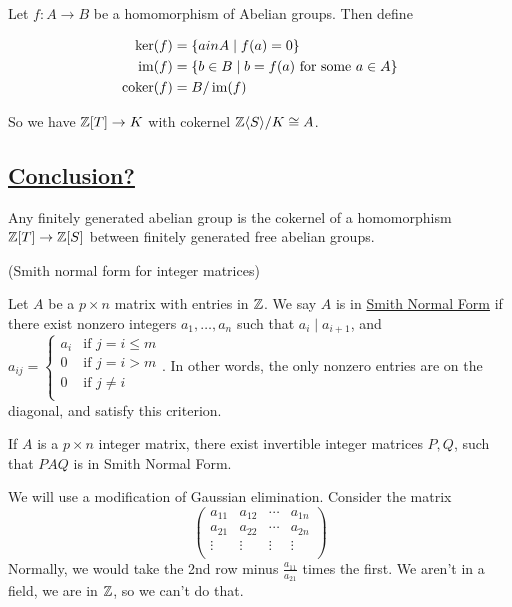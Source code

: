 \documentclass[x11names,reqno,14pt]{extarticle}
\begin{document}
Let $f:A\to B$ be a homomorphism of Abelian groups. Then define

\begin{align*}
\ker(f) & = \{a in A \mid f(a) = 0 \} \\
\operatorname{\mathrm{im}}(f) & = \{ b \in B \mid b = f(a)\text{ for some }a \in A \} \\
\operatorname{\mathrm{coker}}(f) & = B/\operatorname{\mathrm{im}}(f) \\
\end{align*}

So we have $\mathbb{Z}[T] \to K$ with cokernel $\mathbb{Z}\langle S \rangle/K \cong A$. 

\subsection*{\underline{Conclusion?}}

Any finitely generated abelian group is the cokernel of a homomorphism $\mathbb{Z}[T]\to \mathbb{Z}[S]$ between finitely generated free abelian groups. 

 (Smith normal form for integer matrices)

Let $A$ be a $p \times n$ matrix with entries in $\mathbb{Z}$. We say $A$ is in \underline{Smith Normal Form} if there exist nonzero integers $a_1,\dots, a_n$ such that $a_i \mid a_{i + 1}$, and $a_{ij} = \begin{cases} a_i & \text{if }j = i\leq m \\ 0 & \text{if } j = i > m \\ 0 & \text{if }j \neq i \\ \end{cases}$. In other words, the only nonzero entries are on the diagonal, and satisfy this criterion. 

\thm

If $A$ is a $p \times n$ integer matrix, there exist invertible integer matrices $P, Q$, such that $PAQ$ is in Smith Normal Form.

\proof

We will use a modification of Gaussian elimination. Consider the matrix
\[
\begin{pmatrix} 
a_{11} & a_{12} & \cdots & a_{1n} \\
a_{21} & a_{22} & \cdots & a_{2n} \\
\vdots & \vdots & \vdots & \vdots \\
\end{pmatrix}
\]
Normally, we would take the 2nd row minus $\frac{a_{11}}{a_{21}}$ times the first. We aren't in a field, we are in $\mathbb{Z}$, so we can't do that. 
\end{document}
